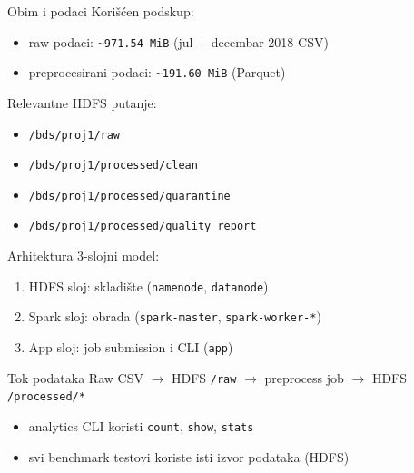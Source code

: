 \documentclass[aspectratio=169,11pt]{beamer}
\newcommand{\code}[1]{\texttt{\small #1}}
\begin{document}
\begin{frame}{Obim i podaci}
  Korišćen podskup:
  \begin{itemize}
    \item raw podaci: \code{\textasciitilde 971.54 MiB} (jul + decembar 2018 CSV)
    \item preprocesirani podaci: \code{\textasciitilde 191.60 MiB} (Parquet)
  \end{itemize}

  \vspace{0.35cm}
  Relevantne HDFS putanje:
  \begin{itemize}
    \item \code{/bds/proj1/raw}
    \item \code{/bds/proj1/processed/clean}
    \item \code{/bds/proj1/processed/quarantine}
    \item \code{/bds/proj1/processed/quality\_report}
  \end{itemize}
\end{frame}

\begin{frame}{Arhitektura}
  3-slojni model:
  \begin{enumerate}
    \item HDFS sloj: skladište (\code{namenode}, \code{datanode})
    \item Spark sloj: obrada (\code{spark-master}, \code{spark-worker-*})
    \item App sloj: job submission i CLI (\code{app})
  \end{enumerate}

  \vspace{0.35cm}
  \begin{block}{Tok podataka}
    Raw CSV $\rightarrow$ HDFS \code{/raw} $\rightarrow$ preprocess job $\rightarrow$ HDFS \code{/processed/*}
  \end{block}

  \begin{itemize}
    \item analytics CLI koristi \code{count}, \code{show}, \code{stats}
    \item svi benchmark testovi koriste isti izvor podataka (HDFS)
  \end{itemize}
\end{frame}
\end{document}
